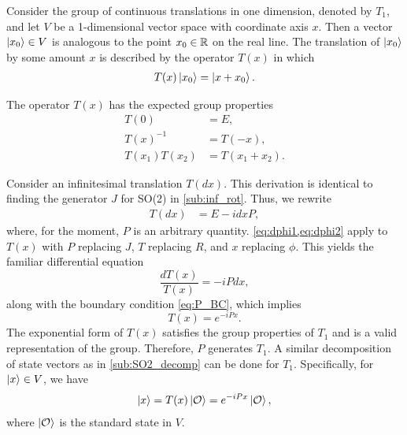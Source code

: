     Consider the group of continuous translations in one dimension, denoted by $T_1$, and let $V$ be a 1-dimensional vector space with coordinate axis $x$. Then a vector $\ket{x_0}\in V$ is analogous to the point $x_0\in\mathbb{R}$ on the real line. The translation of $\ket{x_0}$ by some amount $x$ is described by the operator $T(x)$ in which
    \begin{align*}
        T(x)\ket{x_0} = \ket{x+x_0}.
    \end{align*}

    The operator $T(x)$ has the expected group properties
    \begin{align}
        T(0) &= E, \label{eq:P_BC} \\
        T(x)^{-1} &= T(-x), \label{eq:P_inv}\\
        T(x_1)T(x_2) &= T(x_1+x_2).\label{eq:P_add}
    \end{align}

    Consider an infinitesimal translation $T(dx)$. This derivation is identical to finding the generator $J$ for SO(2) in \cref{sub:inf_rot}. Thus, we rewrite
    \begin{align*}
        T(dx) &= E - i dx P,
    \end{align*}
    where, for the moment, $P$ is an arbitrary quantity. \cref{eq:dphi1,eq:dphi2} apply to $T(x)$ with $P$ replacing $J$, $T$ replacing $R$, and $x$ replacing $\phi$. This yields the familiar differential equation
    \begin{equation}
        \frac{dT(x)}{T(x)} = -iP dx,
    \end{equation}
    along with the boundary condition \cref{eq:P_BC}, which implies
    \begin{equation}
        T(x) = e^{-iPx}.
    \end{equation}
    The exponential form of $T(x)$ satisfies the group properties of $T_1$ and is a valid representation of the group. Therefore, $P$ generates $T_1$. A similar decomposition of state vectors as in \cref{sub:SO2_decomp} can be done for $T_1$. Specifically, for $\ket{x}\in V$, we have
    \begin{align*}
        \ket{x} = T(x)\ket{\mathcal{O}} = e^{-iPx}\ket{\mathcal{O}},
    \end{align*}
    where $\ket{\mathcal{O}}$ is the standard state in $V$.

